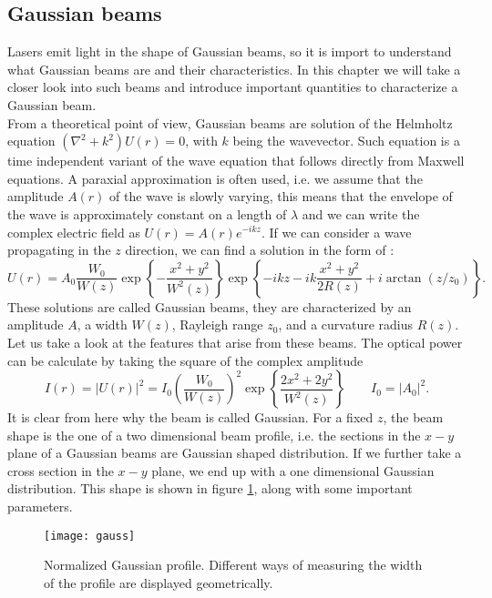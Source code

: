 \subsection{Gaussian beams}
\label{sec_diffraction}
Lasers emit light in the shape of Gaussian beams, so it is import to understand what Gaussian beams are and their characteristics. In this chapter we will take a closer look into such beams and introduce important quantities to characterize a Gaussian beam. \\
From a theoretical point of view, Gaussian beams are solution of the Helmholtz equation $(\nabla^2 + k^2)U(r) = 0$, with $k$ being the wavevector. Such equation is a time independent variant of the wave equation that follows directly from Maxwell equations. A paraxial approximation is often used, i.e.  we assume that the amplitude $A(r)$ of the wave is slowly varying, this means that the envelope of the wave is approximately constant on a length of $\lambda$ and we can write the complex electric field as $U(r) = A(r)e^{-ikz}$. If we can consider a wave propagating in the $z$ direction, we can find a solution in the form of \cite{saleh}:
\begin{equation}
\label{gaussianbeams}
U(r) = A_0 \frac{W_0}{W(z)}\exp\left\{-\frac{x^2+y^2}{W^2(z)}\right\}\exp\left\{-ikz-ik\frac{x^2+y^2}{2R(z)}+i\arctan(z/z_0)\right\}.
\end{equation}
 These solutions are called Gaussian beams, they are characterized by an amplitude $A$, a width $W(z)$, Rayleigh range $z_0$, and a curvature radius $R(z)$. Let us take a look at the features that arise from these beams. The optical power can be calculate by taking the square of the complex amplitude
\begin{equation}
\label{beamintensity}
I(r) = |U(r)|^2 = I_0 \left(\frac{W_0}{W(z)}\right)^2 \exp\left\{\frac{2x^2 + 2y^2}{W^2(z)}\right\}  \qquad I_0 = |A_0|^2.
\end{equation}
It is clear from here why the beam is called Gaussian. For a fixed $z$, the beam shape is the one of a two dimensional beam profile, i.e. the sections in the $x-y$ plane of a Gaussian beams are Gaussian shaped distribution. If we further take a cross section in the $x-y$ plane, we end up with a one dimensional Gaussian distribution. This shape is shown in figure \ref{gauss}, along with some important parameters.
\begin{figure}
\centering
\texttt{[image: gauss]}
\caption{Normalized Gaussian profile. Different ways of measuring the width of the profile are displayed geometrically.}
\label{gauss}
\end{figure}
